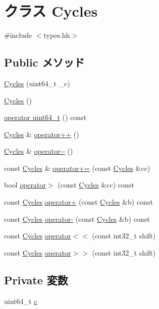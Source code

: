 \hypertarget{classCycles}{
\section{クラス Cycles}
\label{classCycles}
}


{\ttfamily \#include $<$types.hh$>$}\subsection*{Public メソッド}
\begin{DoxyCompactItemize}
\item 
\hyperlink{classCycles_a9ce5a70bae621848f60ec089ea37d9ab}{Cycles} (uint64\_\-t \_\-c)
\item 
\hyperlink{classCycles_a61a19851e99ce348eb6548355467ca64}{Cycles} ()
\item 
\hyperlink{classCycles_a6b0df69d39b0e944a8337f52c840be2d}{operator uint64\_\-t} () const 
\item 
\hyperlink{classCycles}{Cycles} \& \hyperlink{classCycles_a54db4970c7658b61bd48408c3a947f05}{operator++} ()
\item 
\hyperlink{classCycles}{Cycles} \& \hyperlink{classCycles_acd85c1242965524268337c9d61b45677}{operator-\/-\/} ()
\item 
const \hyperlink{classCycles}{Cycles} \& \hyperlink{classCycles_a54b902ad3a773dfac1ff745334f256b4}{operator+=} (const \hyperlink{classCycles}{Cycles} \&cc)
\item 
bool \hyperlink{classCycles_ad7b0acbf9ef316371ab5193f6bd396cf}{operator$>$} (const \hyperlink{classCycles}{Cycles} \&cc) const 
\item 
const \hyperlink{classCycles}{Cycles} \hyperlink{classCycles_a1de47aa3a107127daf93e9ea0822344c}{operator+} (const \hyperlink{classCycles}{Cycles} \&b) const 
\item 
const \hyperlink{classCycles}{Cycles} \hyperlink{classCycles_ac99b1986ebeb3ed9e85b1b1192417458}{operator-\/} (const \hyperlink{classCycles}{Cycles} \&b) const 
\item 
const \hyperlink{classCycles}{Cycles} \hyperlink{classCycles_ae87fefe7d6f57befde4164db9ddaf18d}{operator$<$$<$} (const int32\_\-t shift)
\item 
const \hyperlink{classCycles}{Cycles} \hyperlink{classCycles_a2a6fb5f9c9b4055e4f24fd84f5fcbf59}{operator$>$$>$} (const int32\_\-t shift)
\end{DoxyCompactItemize}
\subsection*{Private 変数}
\begin{DoxyCompactItemize}
\item 
uint64\_\-t \hyperlink{classCycles_ac0abe12146ab4394bf65e09035ef054c}{c}
\end{DoxyCompactItemize}
